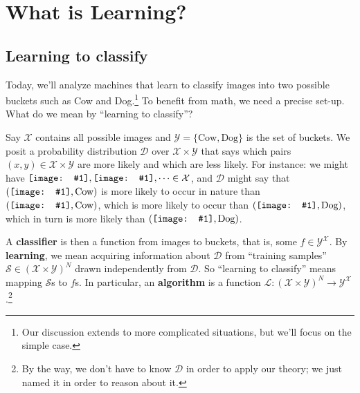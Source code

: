 \documentclass[openany, notitlepage, justified]{tufte-book}
\newcommand{\Dd}{\mathcal{D}}
\newcommand{\Ll}{\mathcal{L}}
\newcommand{\Ss}{\mathcal{S}}
\newcommand{\Xx}{\mathcal{X}}
\newcommand{\Yy}{\mathcal{Y}}
\newcommand{\sdia}[1]{%
    \begingroup%
    \setbox0=\hbox{\texttt{[image: \#1]}}%
    \parbox{\wd0}{\box0}\endgroup%
}
\begin{document}
    \newpage
    \chapter{What is Learning?}
        \section{Learning to classify}
            Today, we'll analyze machines that learn to classify images into
            two possible buckets such as Cow and Dog.\footnote{
                Our discussion extends to more complicated situations, but
                we'll focus on the simple case.  
            }
            To benefit from math, we need a precise set-up.  What do we mean
            by ``learning to classify''?

            Say $\Xx$ contains all possible images and
            $\Yy=\{\text{Cow},\text{Dog}\}$ is the set of buckets.  We posit a
            probability distribution $\Dd$ over $\Xx \times \Yy$ that says
            which pairs $(x,y)\in \Xx\times \Yy$ are more likely and which are
            less likely.  For instance: we might have $\sdia{cow-a},
            \sdia{cow-d},\cdots \in \Xx$, and $\Dd$ might say that
            $(\sdia{cow-a}, \text{Cow})$ is more likely to occur in nature than 
            $(\sdia{cow-d}, \text{Cow})$, which is more likely to occur than
            $(\sdia{cow-d}, \text{Dog})$, which in turn is more likely than
            $(\sdia{cow-a}, \text{Dog})$.

            A \textbf{classifier} is then a function from images to
            buckets, that is, some $f\in \Yy^{\Xx}$.  By \textbf{learning}, we
            mean acquiring information about $\Dd$ from ``training samples''
            $\Ss \in (\Xx\times\Yy)^N$ drawn independently from $\Dd$.  So
            ``learning to classify'' means mapping $\Ss$s to $f$s.  In
            particular, an \textbf{algorithm} is a function
            $\Ll:(\Xx\times\Yy)^N\to \Yy^{\Xx}$.\footnote{ 
                By the way, we don't have to know $\Dd$ in order to apply our
                theory; we just named it in order to reason about it.
            }
\end{document}
